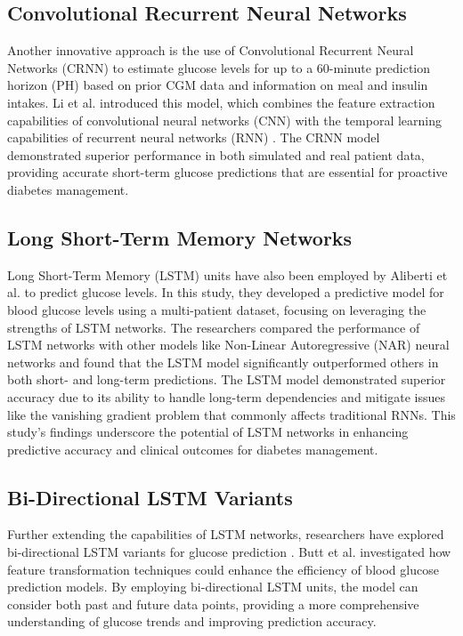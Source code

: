 \subsection{Convolutional Recurrent Neural Networks}
Another innovative approach is the use of Convolutional Recurrent Neural Networks (CRNN) \cite{keren2016convolutional} to estimate glucose levels for up to a 60-minute prediction horizon (PH) based on prior CGM data and information on meal and insulin intakes. Li et al. \cite{li2019convolutional} introduced this model, which combines the feature extraction capabilities of convolutional neural networks (CNN) \cite{li2021survey} with the temporal learning capabilities of recurrent neural networks (RNN) \cite{medsker2001recurrent}. The CRNN model demonstrated superior performance in both simulated and real patient data, providing accurate short-term glucose predictions that are essential for proactive diabetes management.

\subsection{Long Short-Term Memory Networks}
Long Short-Term Memory (LSTM) \cite{hochreiter1997long} units have also been employed by Aliberti et al. \cite{aliberti2019multi} to predict glucose levels. In this study, they developed a predictive model for blood glucose levels using a multi-patient dataset, focusing on leveraging the strengths of LSTM networks. The researchers compared the performance of LSTM networks with other models like Non-Linear Autoregressive (NAR) neural networks \cite{billings2013nonlinear} and found that the LSTM model significantly outperformed others in both short- and long-term predictions. The LSTM model demonstrated superior accuracy due to its ability to handle long-term dependencies and mitigate issues like the vanishing gradient problem that commonly affects traditional RNNs. This study's findings underscore the potential of LSTM networks in enhancing predictive accuracy and clinical outcomes for diabetes management.

\subsection{Bi-Directional LSTM Variants}
Further extending the capabilities of LSTM networks, researchers have explored bi-directional LSTM variants for glucose prediction \cite{sun2018predicting}. Butt et al. \cite{butt2023feature} investigated how feature transformation techniques could enhance the efficiency of blood glucose prediction models. By employing bi-directional LSTM units, the model can consider both past and future data points, providing a more comprehensive understanding of glucose trends and improving prediction accuracy.

